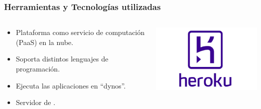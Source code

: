\begin{frame}
	\frametitle{Herramientas y Tecnologías utilizadas}
	\begin{columns}
			\begin{column}{0.6\textwidth}
					\begin{itemize}
						\item {Plataforma como servicio de computación (PaaS) en la nube}.
						\item {Soporta distintos lenguajes de programación}.
						\item {Ejecuta las aplicaciones en ``dynos''.}
						\item {Servidor de \ULLAR{}}.
					\end{itemize}
				\endblock{}
			\end{column}
			\begin{column}{0.4\textwidth}
				\vfill 
					\begin{center}
						\includegraphics[width=0.9\linewidth]{Images/heroku}
					\end{center}
			\end{column}
	\end{columns}
\end{frame}

